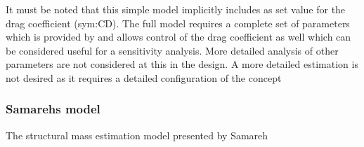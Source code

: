  It must be noted that this simple model implicitly includes as set value for the drag coefficient (\gls{sym:CD}). The full model requires a complete set of parameters which is provided by \cite{Anderson1969} and allows control of the drag coefficient as well which can be considered useful for a sensitivity analysis. More detailed analysis of other parameters are not considered at this in the design. A more detailed estimation is not desired as it requires a detailed configuration of the concept

\subsubsection{Samarehs model}

The structural mass estimation model presented by Samareh 